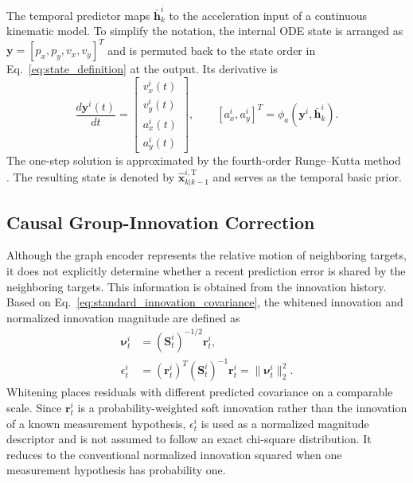 \documentclass[10pt,doublecolumn]{IEEEtaes}
\begin{document}
The temporal predictor maps $\bar{\mathbf{h}}_{k}^{i}$ to the acceleration input of a continuous kinematic model. To simplify the notation, the internal ODE state is arranged as $\mathbf{y}=[p_x,p_y,v_x,v_y]^T$ and is permuted back to the state order in Eq.~\eqref{eq:state_definition} at the output. Its derivative is
\begin{equation}
\frac{d\mathbf{y}^{i}(t)}{dt}=
\begin{bmatrix}
v_x^{i}(t)\\v_y^{i}(t)\\
a_x^{i}(t)\\a_y^{i}(t)
\end{bmatrix},\qquad
[a_x^{i},a_y^{i}]^{T}=\phi_a(\mathbf{y}^{i},\bar{\mathbf{h}}_{k}^{i}).
\label{eq:ode_dynamics}
\end{equation}
The one-step solution is approximated by the fourth-order Runge--Kutta method \cite{kutta1901beitrag}. The resulting state is denoted by $\hat{\mathbf{x}}_{k|k-1}^{i,\mathrm{T}}$ and serves as the temporal basic prior.

\subsection{Causal Group-Innovation Correction}

Although the graph encoder represents the relative motion of neighboring targets, it does not explicitly determine whether a recent prediction error is shared by the neighboring targets. This information is obtained from the innovation history. Based on Eq.~\eqref{eq:standard_innovation_covariance}, the whitened innovation and normalized innovation magnitude are defined as
\begin{align}
\boldsymbol{\nu}_{t}^{i}&=(\mathbf{S}_{t}^{i})^{-1/2}\mathbf{r}_{t}^{i},
\label{eq:white_innovation}\\
\epsilon_{t}^{i}&=(\mathbf{r}_{t}^{i})^{T}(\mathbf{S}_{t}^{i})^{-1}\mathbf{r}_{t}^{i}=\|\boldsymbol{\nu}_{t}^{i}\|_2^2.
\label{eq:association_normalized_innovation}
\end{align}
Whitening places residuals with different predicted covariance on a comparable scale. Since $\mathbf{r}_t^i$ is a probability-weighted soft innovation rather than the innovation of a known measurement hypothesis, $\epsilon_t^i$ is used as a normalized magnitude descriptor and is not assumed to follow an exact chi-square distribution. It reduces to the conventional normalized innovation squared when one measurement hypothesis has probability one.
\end{document}
